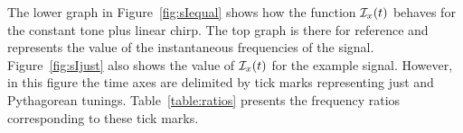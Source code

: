 The lower graph in
Figure~\ref{fig:sIequal} shows how the function $\mathcal{I}_x(t)$ behaves for the
constant tone plus linear chirp.  The top graph is there for reference and
represents the value of the instantaneous frequencies of the signal.
Figure~\ref{fig:sIjust} also shows the value of $\mathcal{I}_x(t)$ for the example signal.
However, in this figure the time axes are delimited by tick marks representing
just and Pythagorean tunings. Table~\ref{table:ratios} presents the frequency
ratios corresponding to these tick marks.



